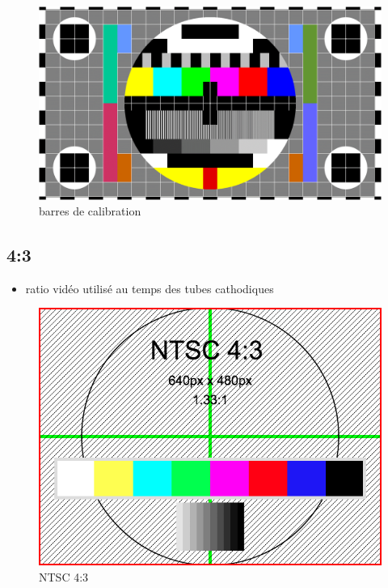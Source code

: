 \documentclass[
  french,
]{book}
\providecommand{\tightlist}{%
  \setlength{\itemsep}{0pt}\setlength{\parskip}{0pt}}
\begin{document}
\begin{figure}
\centering
\includegraphics{medias/lexique/barre_couleurs-1600x900.png}
\caption{barres de calibration}
\end{figure}

\hypertarget{section-2}{%
\subsection{4:3}\label{section-2}}

\begin{itemize}
\tightlist
\item
  ratio vidéo utilisé au temps des tubes cathodiques
\end{itemize}

\begin{figure}
\centering
\includegraphics{medias/lexique/NTSC_4_3_640x480.png}
\caption{NTSC 4:3}
\end{figure}
\end{document}
